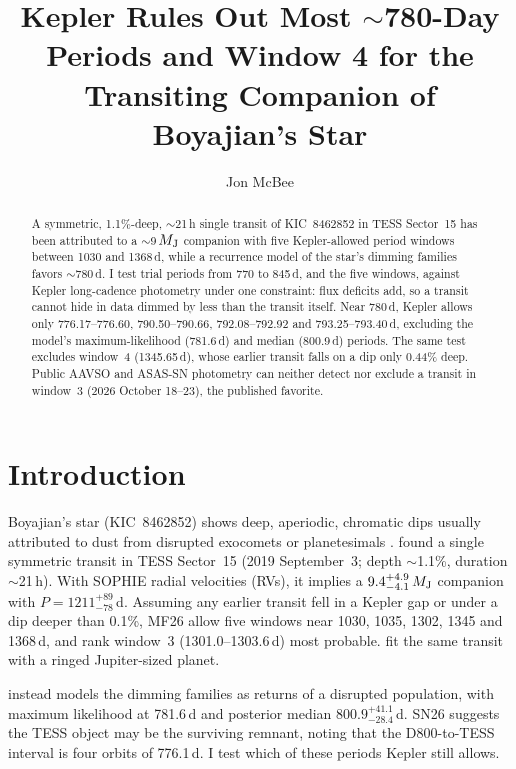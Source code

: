 \documentclass{aastex701}
\begin{document}
\title{Kepler Rules Out Most $\sim$780-Day Periods and Window 4 for the Transiting Companion of Boyajian's Star}

\author[orcid=0009-0000-7524-4470]{Jon McBee}

\begin{abstract}
A symmetric, 1.1\%-deep, $\sim$21\,h single transit of KIC~8462852 in TESS Sector~15 has been attributed to a
$\sim$9\,$M_{\rm J}$ companion with five Kepler-allowed period windows between 1030 and 1368\,d, while a recurrence
model of the star's dimming families favors $\sim$780\,d. I test trial periods from 770 to 845\,d, and the five
windows, against Kepler long-cadence photometry under one constraint: flux deficits add, so a transit cannot hide
in data dimmed by less than the transit itself. Near 780\,d, Kepler allows only 776.17--776.60, 790.50--790.66,
792.08--792.92 and 793.25--793.40\,d, excluding the model's maximum-likelihood (781.6\,d) and median (800.9\,d)
periods. The same test excludes window~4 (1345.65\,d), whose earlier transit falls on a dip only 0.44\% deep.
Public AAVSO and ASAS-SN photometry can neither detect nor exclude a transit in window~3 (2026 October 18--23),
the published favorite.
\end{abstract}


\section{Introduction}

Boyajian's star (KIC~8462852) shows deep, aperiodic, chromatic dips usually attributed to dust from disrupted
exocomets or planetesimals \citep{Boyajian2016}. \citet[hereafter MF26]{MF26} found a single symmetric transit
in TESS Sector~15 (2019 September~3; depth $\sim$1.1\%, duration $\sim$21\,h). With SOPHIE radial velocities
(RVs), it implies a $9.4^{+4.9}_{-4.1}\,M_{\rm J}$ companion with $P=1211^{+89}_{-78}$\,d. Assuming any earlier
transit fell in a Kepler gap or under a dip deeper than 0.1\%, MF26 allow five windows near 1030, 1035, 1302,
1345 and 1368\,d, and rank window~3 (1301.0--1303.6\,d) most probable. \citet{Zhu2026} fit the same transit with
a ringed Jupiter-sized planet.

\citet[hereafter SN26]{SN26} instead models the dimming families as returns of a disrupted population, with
maximum likelihood at 781.6\,d and posterior median $800.9^{+41.1}_{-28.4}$\,d. SN26 suggests the TESS object
may be the surviving remnant, noting that the D800-to-TESS interval is four orbits of 776.1\,d. I test which of
these periods Kepler still allows.
\end{document}
